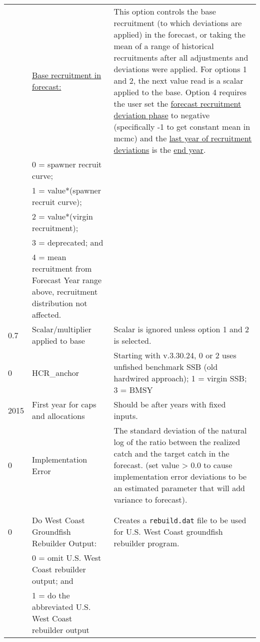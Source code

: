 \begin{landscape}
{\begin{longtable}{p{2cm} p{7cm} p{12cm}}
  \pagebreak
  1 \Tstrut & \hyperlink{ForeSpawn}{Base recruitment in forecast:} \hypertarget{FcastRecruitment}{} & \multirow{1}{1cm}[-0.25cm]{\parbox{12cm}{This option controls the base recruitment (to which deviations are applied) in the forecast, or taking the mean of a range of historical recruitments after all adjustments and deviations were applied. For options 1 and 2, the next value read is a scalar applied to the base. Option 4 requires the user set the \hyperlink{FcastRecDevPhase}{forecast recruitment deviation phase} to negative (specifically -1 to get constant mean in \gls{mcmc}) and the \hyperlink{RecDevEndYear}{last year of recruitment deviations} is the \hyperlink{EndYear}{end year}.}} \\
    & 0 = spawner recruit curve; & \\
    & 1 = value*(spawner recruit curve); & \\
    & 2 = value*(virgin recruitment); & \\
    & 3 = deprecated; and & \\
    & 4 = mean recruitment from Forecast Year range above, recruitment distribution not affected. & \Bstrut\\

  \hline
  0.7 \Tstrut & Scalar/multiplier applied to base & \multirow{1}{1cm}[-0.05cm]{\parbox{12cm}{Scalar is ignored unless option 1 and 2 is selected.}} \Bstrut\\

  \hline
  0 & HCR\_anchor & Starting with v.3.30.24, 0 or 2 uses unfished benchmark SSB (old hardwired approach); 1 = virgin SSB; 3 = BMSY \Tstrut\Bstrut\\
  
  \hline
  2015 \Tstrut & First year for caps and allocations & \multirow{1}{1cm}[-0.10cm]{\parbox{12cm}{Should be after years with fixed inputs.}} \Bstrut\\

  \hline
  0 \Tstrut & Implementation Error & \multirow{1}{1cm}[-0.2cm]{\parbox{12cm}{The standard deviation of the natural log of the ratio between the realized catch and the target catch in the forecast. (set value > 0.0 to cause implementation error deviations to be an estimated parameter that will add variance to forecast).}} \Bstrut\\
    & & \Bstrut\\
    & & \Bstrut\\

  \hline
  0 \Tstrut & Do West Coast Groundfish Rebuilder Output: &\multirow{1}{1cm}[-0.2cm]{\parbox{12cm}{Creates a \texttt{rebuild.dat} file to be used for U.S. West Coast groundfish rebuilder program.}} \\
    & 0 = omit U.S. West Coast rebuilder output; and & \\
    & 1 = do the abbreviated U.S. West Coast rebuilder output \Bstrut\\


\end{longtable}}
\end{landscape}

